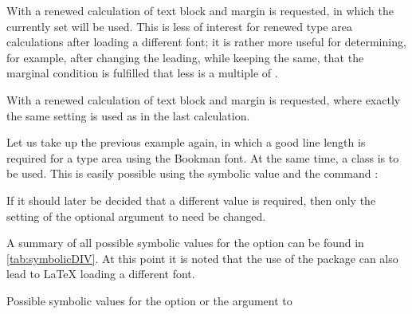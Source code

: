 With 
a renewed calculation of text block and margin is requested, in which
the currently set  will be used. This is less of interest for
renewed type area calculations after loading a different font; it is
rather more useful for determining, for example, after changing the
leading, while keeping  the same, that the marginal condition
is fulfilled that  less
 is a multiple of .

With  a
renewed calculation of text block and margin is requested, where
exactly the same setting is used as in the last calculation.

\begin{Example}
  Let us take up the previous example again, in which a good line
  length is required for a type area using the Bookman font. At the
  same time, a {\KOMAScript} class is to be used. This is easily
  possible using the symbolic value  and the command
  :
If it should later be decided that a different  value is
required, then only the setting of the optional argument to
 need be changed.
\end{Example}

A summary of all possible symbolic values for the  option
can be found in \autoref{tab:symbolicDIV}. At this point it is noted
that the use of the  package
can also lead to \LaTeX{} loading a different font.

\begin{table}
  \caption[{Symbolic values for the  option and the
     argument to }]{Possible symbolic values for the  option or the  argument to
    }
  \label{tab:symbolicDIV}
  \begin{desctabular}
  \end{desctabular}
\end{table}

